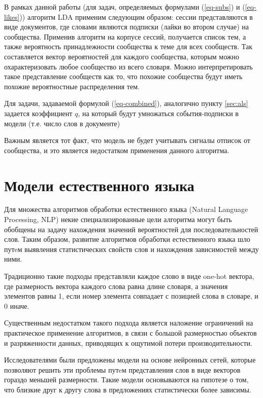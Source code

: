 \documentclass[times,specification,annotation]{itmo-student-thesis}
\begin{document}
В рамках данной работы (для задач, определяемых формулами (\ref{eq-subs}) и (\ref{eq-likes})) алгоритм LDA применим следующим образом: сессии представляются в виде документов, где словами являются подписки (лайки во втором случае) на сообщества. Применив алгоритм на корпусе сессий, получается список тем, а также вероятность принадлежности сообщества к теме для всех сообществ. Так составляется вектор вероятностей для каждого сообщества, которым можно охарактеризовать любое сообщество из всего словаря. Можно интерпретировать такое представление сообществ как то, что похожие сообщества будут иметь похожие вероятностные распределения тем. 

Для задачи, задаваемой формулой (\ref{eq-combined}), аналогично пункту \ref{sec:als} задается коэффициент $q$, на который будут умножаться события-подписки в модели (т.е. число слов в документе) 
 
Важным является тот факт, что модель не будет учитывать сигналы отписок от сообщества, и это является недостатком применения данного алгоритма. 

\section{Модели естественного языка}\label{sec:nlp-intro}

Для множества алгоритмов обработки естественного языка (Natural Language Processing, NLP) некие специализированные цели алгоритма могут быть обобщены на задачу нахождения значений вероятностей для последовательностей слов.
Таким образом, развитие алгоритмов обработки естественного языка шло путeм выявления статистических свойств слов и нахождения зависимостей между ними.

Традиционно такие подходы представляли каждое слово в виде one-hot вектора, где размерность вектора каждого слова равна длине словаря, а значения элементов равны 1, если номер элемента совпадает с позицией слова в словаре, и 0 иначе.  

Существенным недостатком такого подхода является наложение ограничений на практическое применение алгоритмов, в связи с большой размерностью объектов и разряженности данных, приводящих к ощутимой потери производительности.

Исследователями были предложены модели на основе нейронных сетей\cite{turian2010}, которые позволяют решить эти проблемы путeм представления слов в виде векторов гораздо меньшей размерности. Такие модели основываются на гипотезе о том, что близкие друг к другу слова в предложениях статистически более зависимы.
\end{document}
